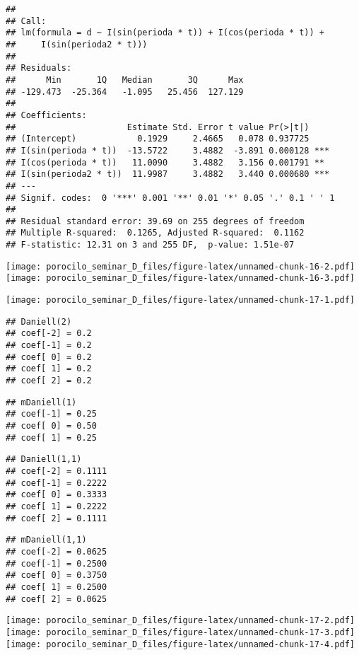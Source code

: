 \documentclass[
]{article}
\begin{document}
\begin{verbatim}
## 
## Call:
## lm(formula = d ~ I(sin(perioda * t)) + I(cos(perioda * t)) + 
##     I(sin(perioda2 * t)))
## 
## Residuals:
##      Min       1Q   Median       3Q      Max 
## -129.473  -25.364   -1.095   25.456  127.129 
## 
## Coefficients:
##                      Estimate Std. Error t value Pr(>|t|)    
## (Intercept)            0.1929     2.4665   0.078 0.937725    
## I(sin(perioda * t))  -13.5722     3.4882  -3.891 0.000128 ***
## I(cos(perioda * t))   11.0090     3.4882   3.156 0.001791 ** 
## I(sin(perioda2 * t))  11.9987     3.4882   3.440 0.000680 ***
## ---
## Signif. codes:  0 '***' 0.001 '**' 0.01 '*' 0.05 '.' 0.1 ' ' 1
## 
## Residual standard error: 39.69 on 255 degrees of freedom
## Multiple R-squared:  0.1265, Adjusted R-squared:  0.1162 
## F-statistic: 12.31 on 3 and 255 DF,  p-value: 1.51e-07
\end{verbatim}

\texttt{[image: porocilo\_seminar\_D\_files/figure-latex/unnamed-chunk-16-2.pdf]}
\texttt{[image: porocilo\_seminar\_D\_files/figure-latex/unnamed-chunk-16-3.pdf]}

\texttt{[image: porocilo\_seminar\_D\_files/figure-latex/unnamed-chunk-17-1.pdf]}

\begin{verbatim}
## Daniell(2) 
## coef[-2] = 0.2
## coef[-1] = 0.2
## coef[ 0] = 0.2
## coef[ 1] = 0.2
## coef[ 2] = 0.2
\end{verbatim}

\begin{verbatim}
## mDaniell(1) 
## coef[-1] = 0.25
## coef[ 0] = 0.50
## coef[ 1] = 0.25
\end{verbatim}

\begin{verbatim}
## Daniell(1,1) 
## coef[-2] = 0.1111
## coef[-1] = 0.2222
## coef[ 0] = 0.3333
## coef[ 1] = 0.2222
## coef[ 2] = 0.1111
\end{verbatim}

\begin{verbatim}
## mDaniell(1,1) 
## coef[-2] = 0.0625
## coef[-1] = 0.2500
## coef[ 0] = 0.3750
## coef[ 1] = 0.2500
## coef[ 2] = 0.0625
\end{verbatim}

\texttt{[image: porocilo\_seminar\_D\_files/figure-latex/unnamed-chunk-17-2.pdf]}
\texttt{[image: porocilo\_seminar\_D\_files/figure-latex/unnamed-chunk-17-3.pdf]}
\texttt{[image: porocilo\_seminar\_D\_files/figure-latex/unnamed-chunk-17-4.pdf]}
\end{document}
